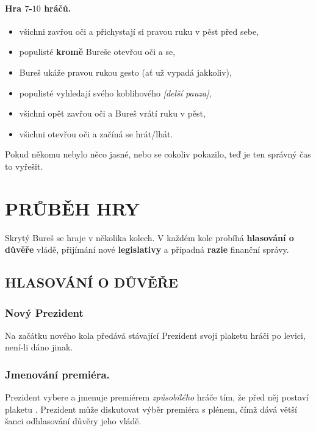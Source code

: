 \documentclass{article}
\begin{document}
    \paragraph{Hra $7$-$10$ hráčů.}
    \begin{itemize}
        \item všichni zavřou oči a přichystají si pravou ruku v pěst před sebe,
        \item populisté {\bf kromě} Bureše otevřou oči a  se,
        \item Bureš ukáže pravou rukou gesto  (ať už vypadá jakkoliv),
        \item populisté vyhledají svého koblihového {\it [delší pauza]},
        \item všichni opět zavřou oči a Bureš vrátí ruku v pěst,
        \item všichni otevřou oči a začíná se hrát/lhát.
    \end{itemize}
    Pokud někomu nebylo něco jasné, nebo se cokoliv pokazilo, teď je ten správný čas to vyřešit. %


    \section*{PRŮBĚH HRY}

    Skrytý Bureš se hraje v několika kolech. V každém kole probíhá {\bf hlasování o důvěře} vládě, přijímání nové {\bf legislativy} a případná {\bf razie} finanční správy. %

    \subsection*{HLASOVÁNÍ O DŮVĚŘE}

        \subsubsection{Nový Prezident}

            Na začátku nového kola předává stávající Prezident svoji plaketu hráči po levici, není-li dáno jinak.
        \subsubsection{Jmenování premiéra.}

            Prezident vybere a jmenuje premiérem {\it způ\-so\-bi\-lé\-ho} hráče tím, že před něj postaví plaketu . Prezident může diskutovat výběr premiéra s plénem, čímž dává větší šanci odhlasování důvěry jeho vládě.
\end{document}
